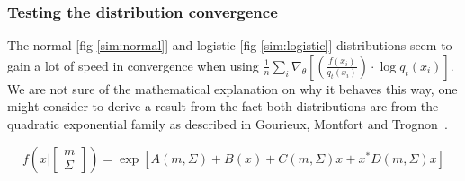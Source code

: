 \subsubsection{Testing the distribution convergence}

The normal [fig \ref{sim:normal}] and logistic [fig \ref{sim:logistic}] distributions seem to gain a lot of speed in convergence when using $\displaystyle{\frac 1 n \sum\limits_i \nabla_\theta \left[ \left( \frac{f(x_i)}{q_t(x_i)}\right) \cdot \log q_t(x_i) \right]}$. 
We are not sure of the mathematical explanation on why it behaves this way, one might consider to derive a result from the fact both distributions are from the quadratic exponential family as described in Gourieux, Montfort and Trognon~\cite{pmle}.

$$f(x \vert \begin{bmatrix}
    m \\ \Sigma
\end{bmatrix}) = \exp \left[ A(m, \Sigma) + B(x) + C(m, \Sigma)x + x^* D(m, \Sigma) x \right]$$

